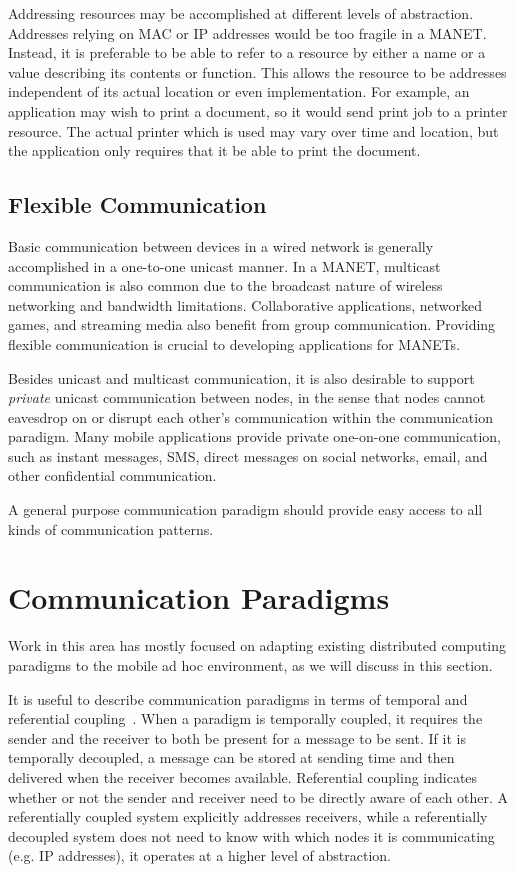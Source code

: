 Addressing resources may be accomplished at different levels of abstraction. Addresses relying on MAC or IP addresses would be too fragile in a MANET. Instead, it is preferable to be able to refer to a resource by either a name or a value describing its contents or function. This allows the resource to be addresses independent of its actual location or even implementation. For example, an application may wish to print a document, so it would send print job to a printer resource. The actual printer which is used may vary over time and location, but the application only requires that it be able to print the document.

\subsection{Flexible Communication}

Basic communication between devices in a wired network is generally accomplished in a one-to-one unicast manner. In a MANET, multicast communication is also common due to the broadcast nature of wireless networking and bandwidth limitations. Collaborative applications, networked games, and streaming media also benefit from group communication. Providing flexible communication is crucial to developing applications for MANETs.

Besides unicast and multicast communication, it is also desirable to support \textit{private} unicast communication between nodes, in the sense that nodes cannot eavesdrop on or disrupt each other's communication within the communication paradigm. Many mobile applications provide private one-on-one communication, such as instant messages, SMS, direct messages on social networks, email, and other confidential communication.

A general purpose communication paradigm should provide easy access to all kinds of communication patterns.

\section{Communication Paradigms}\label{paradigms}

Work in this area has mostly focused on adapting existing distributed computing paradigms to the mobile ad hoc environment, as we will discuss in this section.

It is useful to describe communication paradigms in terms of temporal and referential coupling~\cite{distbook}. When a paradigm is temporally coupled, it requires the sender and the receiver to both be present for a message to be sent. If it is temporally decoupled, a message can be stored at sending time and then delivered when the receiver becomes available. Referential coupling indicates whether or not the sender and receiver need to be directly aware of each other. A referentially coupled system explicitly addresses receivers, while a referentially decoupled system does not need to know with which nodes it is communicating (e.g. IP addresses), it operates at a higher level of abstraction.

